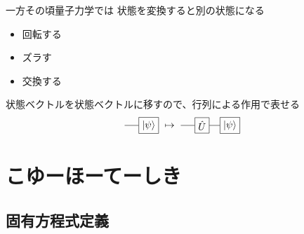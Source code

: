 \documentclass[dvipdfm]{beamer}
\begin{document}
\begin{frame}{一方その頃量子力学では}
    状態を変換すると別の状態になる
    \begin{itemize}
        \item 回転する
        \item ズラす
        \item 交換する
    \end{itemize}
    状態ベクトルを状態ベクトルに移すので、行列による作用で表せる
    \begin{equation*}
        \vcenter{\hbox{
            \begin{tikzpicture}
                \node at(1,0)[draw, rectangle](psi){$\ket{\psi}$};
                \draw(psi.west)--++(-.5,0);
            \end{tikzpicture}
        }}
        \mapsto
        \vcenter{\hbox{
            \begin{tikzpicture}
                \node at(0,0)[draw, rectangle](H){$\hat{U}$};
                \node at(1,0)[draw, rectangle](psi){$\ket{\psi}$};
                \draw(H.east)--(psi.west)(H.west)--++(-.5,0);
            \end{tikzpicture}
        }}
    \end{equation*}
\end{frame}


\section{こゆーほーてーしき}

\subsection{固有方程式定義}
\end{document}
